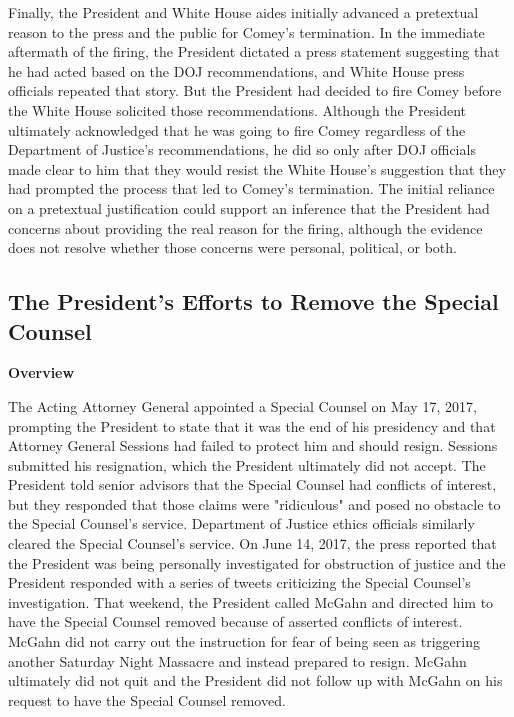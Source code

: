 {Finally, the President and White House aides initially advanced a pretextual reason to the press and the public for Comey's termination.
In the immediate aftermath of the firing, the President dictated a press statement suggesting that he had acted based on the DOJ recommendations, and White House press officials repeated that story.
But the President had decided to fire Comey before the White House solicited those recommendations.
Although the President ultimately acknowledged that he was going to fire Comey regardless of the Department of Justice's recommendations, he did so only after DOJ officials made clear to him that they would resist the White House's suggestion that they had prompted the process that led to Comey's termination.
The initial reliance on a pretextual justification could support an inference that the President had concerns about providing the real reason for the firing, although the evidence does not resolve whether those concerns were personal, political, or both.

\subsection{The President's Efforts to Remove the Special Counsel}

\begin{center}
\textbf{Overview}
\end{center}

The Acting Attorney General appointed a Special Counsel on May 17, 2017, prompting the President to state that it was the end of his presidency and that Attorney General Sessions had failed to protect him and should resign.
Sessions submitted his resignation, which the President ultimately did not accept.
The President told senior advisors that the Special Counsel had conflicts of interest, but they responded that those claims were "ridiculous" and posed no obstacle to the Special Counsel's service.
Department of Justice ethics officials similarly cleared the Special Counsel's service.
On June 14, 2017, the press reported that the President was being personally investigated for obstruction of justice and the President responded with a series of tweets criticizing the Special Counsel's investigation.
That weekend, the President called McGahn and directed him to have the Special Counsel removed because of asserted conflicts of interest.
McGahn did not carry out the instruction for fear of being seen as triggering another Saturday Night Massacre and instead prepared to resign.
McGahn ultimately did not quit and the President did not follow up with McGahn on his request to have the Special Counsel removed.

}
